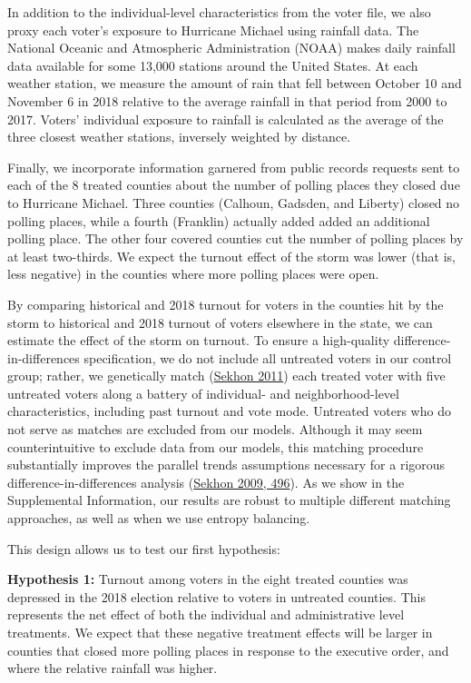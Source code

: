\documentclass[
  12pt,
]{article}
\begin{document}
In addition to the individual-level characteristics from the voter file, we also proxy each voter's exposure to Hurricane Michael using rainfall data. The National Oceanic and Atmospheric Administration (NOAA) makes daily rainfall data available for some 13,000 stations around the United States. At each weather station, we measure the amount of rain that fell between October 10 and November 6 in 2018 relative to the average rainfall in that period from 2000 to 2017. Voters' individual exposure to rainfall is calculated as the average of the three closest weather stations, inversely weighted by distance.

Finally, we incorporate information garnered from public records requests sent to each of the 8 treated counties about the number of polling places they closed due to Hurricane Michael. Three counties (Calhoun, Gadsden, and Liberty) closed no polling places, while a fourth (Franklin) actually added added an additional polling place. The other four covered counties cut the number of polling places by at least two-thirds. We expect the turnout effect of the storm was lower (that is, less negative) in the counties where more polling places were open.

By comparing historical and 2018 turnout for voters in the counties hit by the storm to historical and 2018 turnout of voters elsewhere in the state, we can estimate the effect of the storm on turnout. To ensure a high-quality difference-in-differences specification, we do not include all untreated voters in our control group; rather, we genetically match (\protect\hyperlink{ref-Sekhon2011}{Sekhon 2011}) each treated voter with five untreated voters along a battery of individual- and neighborhood-level characteristics, including past turnout and vote mode. Untreated voters who do not serve as matches are excluded from our models. Although it may seem counterintuitive to exclude data from our models, this matching procedure substantially improves the parallel trends assumptions necessary for a rigorous difference-in-differences analysis (\protect\hyperlink{ref-Sekhon2009}{Sekhon 2009, 496}). As we show in the Supplemental Information, our results are robust to multiple different matching approaches, as well as when we use entropy balancing.

This design allows us to test our first hypothesis:

\textbf{Hypothesis 1:} Turnout among voters in the eight treated counties was depressed in the 2018 election relative to voters in untreated counties. This represents the net effect of both the individual and administrative level treatments. We expect that these negative treatment effects will be larger in counties that closed more polling places in response to the executive order, and where the relative rainfall was higher.
\end{document}
